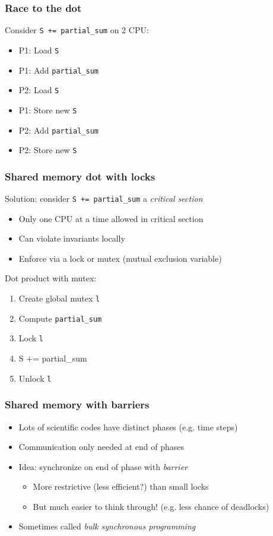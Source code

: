 \documentclass{beamer}
\begin{document}
\begin{frame}[fragile]
  \frametitle{Race to the dot}

  Consider {\tt S += partial\_sum} on 2 CPU:
  \begin{itemize}
  \item P1: Load {\tt S}
  \item P1: Add {\tt partial\_sum}
  \item P2: Load {\tt S}
  \item P1: Store new {\tt S}
  \item P2: Add {\tt partial\_sum}
  \item P2: Store new {\tt S}
  \end{itemize}
\end{frame}

\begin{frame}
  \frametitle{Shared memory dot with locks}

  Solution: consider {\tt S += partial\_sum} a {\em critical section}
  \begin{itemize}
  \item Only one CPU at a time allowed in critical section
  \item Can violate invariants locally
  \item Enforce via a lock or mutex (mutual exclusion variable)
  \end{itemize}
  
  \vspace{5mm}
  Dot product with mutex:
  \begin{enumerate}
  \item Create global mutex {\tt l}
  \item Compute {\tt partial\_sum}
  \item Lock {\tt l}
  \item {S += partial\_sum}
  \item Unlock {\tt l}
  \end{enumerate}

\end{frame}


\begin{frame}
  \frametitle{Shared memory with barriers}
  
  \begin{itemize}
  \item Lots of scientific codes have distinct phases (e.g. time steps)
  \item Communication only needed at end of phases
  \item Idea: synchronize on end of phase with {\em barrier}
    \begin{itemize}
    \item More restrictive (less efficient?) than small locks
    \item But much easier to think through!  (e.g. less chance of deadlocks)
    \end{itemize}
  \item Sometimes called {\em bulk synchronous programming}
  \end{itemize}

\end{frame}
\end{document}

